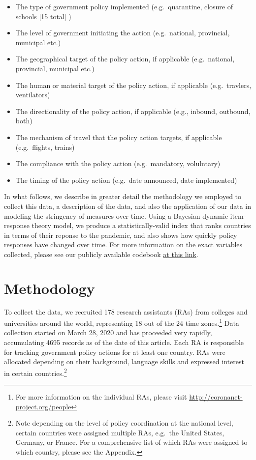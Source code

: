 \documentclass[]{article}
\providecommand{\tightlist}{%
  \setlength{\itemsep}{0pt}\setlength{\parskip}{0pt}}
\let\rmarkdownfootnote\footnote%
\def\footnote{\protect\rmarkdownfootnote}
\begin{document}
\begin{itemize}
\tightlist
\item
  The type of government policy implemented (e.g.~quarantine, closure of schools {[}15 total{]} )
\item
  The level of government initiating the action (e.g.~national, provincial, municipal etc.)
\item
  The geographical target of the policy action, if applicable (e.g.~national, provincial, municipal etc.)
\item
  The human or material target of the policy action, if applicable (e.g.~travlers, ventilators)
\item
  The directionality of the policy action, if applicable (e.g., inbound, outbound, both)
\item
  The mechanism of travel that the policy action targets, if applicable (e.g.~flights, trains)
\item
  The compliance with the policy action (e.g.~mandatory, volulntary)
\item
  The timing of the policy action (e.g.~date announced, date implemented)
\end{itemize}

In what follows, we describe in greater detail the methodology we employed to collect this data, a description of the data, and also the application of our data in modeling the stringency of measures over time. Using a Bayesian dynamic item-response theory model, we produce a statistically-valid index that ranks countries in terms of their reponse to the pandemic, and also shows how quickly policy responses have changed over time. For more information on the exact variables collected, please see our publicly available codebook \href{https://docs.google.com/document/d/1zvNMpwj0onFvUZ_gLl4RRjqS-clbHv3TIX6EOHofsME/edit?usp=sharing}{at this link}.

\hypertarget{methodology}{%
\section{Methodology}\label{methodology}}

To collect the data, we recruited 178 research assistants (RAs) from colleges and universities around the world, representing 18 out of the 24 time zones.\footnote{For more information on the individual RAs, please visit \url{http://coronanet-project.org/people}} Data collection started on March 28, 2020 and has proceeded very rapidly, accumulating 4695 records as of the date of this article. Each RA is responsible for tracking government policy actions for at least one country. RAs were allocated depending on their background, language skills and expressed interest in certain countries.\footnote{Note depending on the level of policy coordination at the national level, certain countries were assigned multiple RAs, e.g.~the United States, Germany, or France. For a comprehensive list of which RAs were assigned to which country, please see the Appendix.}
\end{document}

